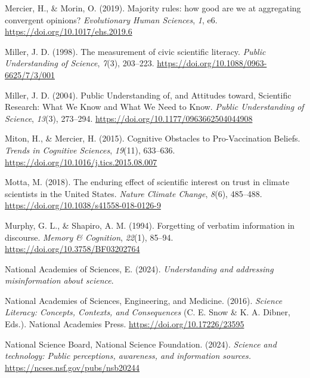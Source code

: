 \documentclass[
  jou,
  floatsintext,
  longtable,
  nolmodern,
  notxfonts,
  notimes,
  colorlinks=true,linkcolor=blue,citecolor=blue,urlcolor=blue]{apa7}
\newlength{\cslhangindent}
\newenvironment{CSLReferences}[2] %
 {\begin{list}{}{%
  \setlength{\itemindent}{0pt}
  \setlength{\leftmargin}{0pt}
  \setlength{\parsep}{0pt}
  \ifodd #1
   \setlength{\leftmargin}{\cslhangindent}
   \setlength{\itemindent}{-1\cslhangindent}
  \fi
  \setlength{\itemsep}{#2\baselineskip}}}
 {\end{list}}
\begin{document}
\begin{CSLReferences}{1}{0}
Mercier, H., \& Morin, O. (2019). Majority rules: how good are we at
aggregating convergent opinions? \emph{Evolutionary Human Sciences},
\emph{1}, e6. \url{https://doi.org/10.1017/ehs.2019.6}

Miller, J. D. (1998). The measurement of civic scientific literacy.
\emph{Public Understanding of Science}, \emph{7}(3), 203--223.
\url{https://doi.org/10.1088/0963-6625/7/3/001}

Miller, J. D. (2004). Public Understanding of, and Attitudes toward,
Scientific Research: What We Know and What We Need to Know. \emph{Public
Understanding of Science}, \emph{13}(3), 273--294.
\url{https://doi.org/10.1177/0963662504044908}

Miton, H., \& Mercier, H. (2015). Cognitive Obstacles to Pro-Vaccination
Beliefs. \emph{Trends in Cognitive Sciences}, \emph{19}(11), 633--636.
\url{https://doi.org/10.1016/j.tics.2015.08.007}

Motta, M. (2018). The enduring effect of scientific interest on trust in
climate scientists in the United States. \emph{Nature Climate Change},
\emph{8}(6), 485--488. \url{https://doi.org/10.1038/s41558-018-0126-9}

Murphy, G. L., \& Shapiro, A. M. (1994). Forgetting of verbatim
information in discourse. \emph{Memory \& Cognition}, \emph{22}(1),
85--94. \url{https://doi.org/10.3758/BF03202764}

National Academies of Sciences, E. (2024). \emph{Understanding and
addressing misinformation about science}.

National Academies of Sciences, Engineering, and Medicine. (2016).
\emph{Science Literacy: Concepts, Contexts, and Consequences} (C. E.
Snow \& K. A. Dibner, Eds.). National Academies Press.
\url{https://doi.org/10.17226/23595}

National Science Board, National Science Foundation. (2024).
\emph{Science and technology: Public perceptions, awareness, and
information sources.} \url{https://ncses.nsf.gov/pubs/nsb20244}


\end{CSLReferences}
\end{document}
